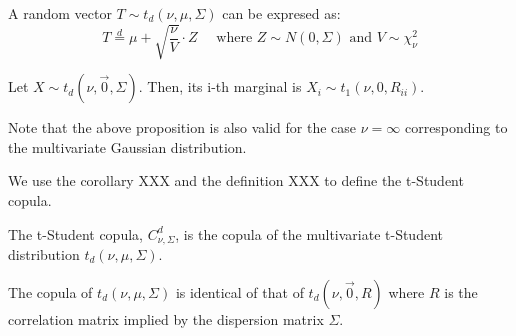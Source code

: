 \documentclass[11pt,fleqn]{book} %
\begin{document}
\begin{proposition}
A random vector $T \sim t_d(\nu,\mu,\Sigma)$ can be expresed as:
\begin{displaymath}
T \stackrel{d}{=} \mu + \sqrt{\frac{\nu}{V}}\cdot Z
\quad \textrm { where } Z \sim N(0,\Sigma) \textrm{ and } V \sim \chi_{\nu}^2
\end{displaymath}
\end{proposition}

\begin{proposition}
Let $X \sim t_d(\nu,\vec{0},\Sigma)$. Then, its i-th marginal is $X_i \sim t_1(\nu,0,R_{ii})$.
\end{proposition}

Note that the above proposition is also valid for the case $\nu=\infty$
corresponding to the multivariate Gaussian distribution.

We use the corollary XXX and the definition XXX to define the t-Student copula.

\begin{definition}
The t-Student copula, $C_{\nu,\Sigma}^d$, is the copula of the multivariate 
t-Student distribution $t_d(\nu,\mu,\Sigma)$.
\end{definition}

\begin{proposition}
The copula of $t_d(\nu,\mu,\Sigma)$ is identical of that of $t_d(\nu,\vec{0},R)$
where $R$ is the correlation matrix implied by the dispersion matrix $\Sigma$.
\end{proposition}
\end{document}
